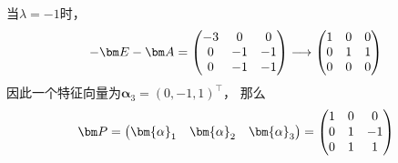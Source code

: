\begin{solution}
    当$\lambda = -1$时，
    \[
        -\mat{E}-\mat{A} =
        \begin{pmatrix}
            -3 & 0  & 0  \\
            0  & -1 & -1 \\
            0  & -1 & -1 \\
        \end{pmatrix}
        \longrightarrow
        \begin{pmatrix}
            1 & 0 & 0 \\
            0 & 1 & 1 \\
            0 & 0 & 0 \\
        \end{pmatrix}
    \]
    因此一个特征向量为$\bm{\alpha}_3 = (0,-1,1)^\intercal$，
    那么
    \[
        \mat{P} =
        \begin{pmatrix}
            \bm{\alpha}_1 & \bm{\alpha}_2 & \bm{\alpha}_3
        \end{pmatrix}
        =
        \begin{pmatrix}
            1 & 0 & 0  \\
            0 & 1 & -1 \\
            0 & 1 & 1
        \end{pmatrix}
    \]
\end{solution}


